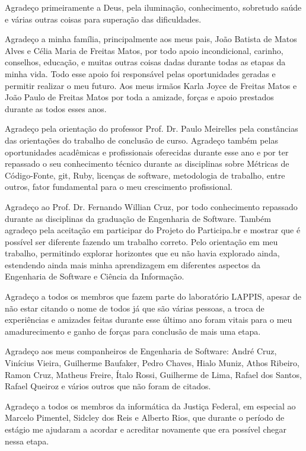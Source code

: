\begin{agradecimentos}

Agradeço primeiramente a Deus, pela iluminação, conhecimento, sobretudo saúde e várias outras coisas para superação das dificuldades.

%

Agradeço a minha família, principalmente aos meus pais, João Batista de Matos Alves e Célia Maria de Freitas Matos, por todo apoio incondicional, carinho, conselhos, educação, e muitas  outras coisas dadas durante todas as etapas da minha vida. Todo esse apoio foi responsável pelas oportunidades geradas e permitir realizar o meu futuro. Aos meus irmãos Karla Joyce de Freitas Matos e João Paulo de Freitas Matos por toda a amizade, forças e apoio prestados durante as todos esses anos.

%

Agradeço pela orientação do professor Prof. Dr. Paulo Meirelles pela constâncias das orientações do trabalho de conclusão de curso. Agradeço também pelas oportunidades acadêmicas e profissionais oferecidas durante esse ano e por ter repassado o seu conhecimento técnico durante as disciplinas sobre Métricas de Código-Fonte, git, Ruby, licenças de software, metodologia de trabalho, entre outros, fator fundamental para o meu crescimento profissional. 

%

Agradeço ao Prof. Dr. Fernando Willian Cruz, por todo conhecimento repassado durante as disciplinas da graduação de Engenharia de Software. Também agradeço pela aceitação em participar do Projeto do Participa.br e mostrar que é possível ser diferente fazendo um trabalho correto. Pelo orientação em meu trabalho, permitindo explorar horizontes que eu não havia explorado ainda, estendendo ainda mais minha aprendizagem em diferentes aspectos da Engenharia de Software e Ciência da Informação.

%

Agradeço a todos os membros que fazem parte do laboratório LAPPIS, apesar de não estar citando o nome de todos já que são várias pessoas, a troca de experiências e amizades feitas durante esse último ano foram vitais para o meu amadurecimento e ganho de forças para conclusão de mais uma etapa.

%

Agradeço aos meus companheiros de Engenharia de Software: André Cruz, Vinícius Vieira, Guilherme Baufaker, Pedro Chaves, Hialo Muniz, Athos Ribeiro, Ramon Cruz, Matheus Freire, Ítalo Rossi, Guilherme de Lima, Rafael dos Santos, Rafael Queiroz e vários outros que não foram de citados.

%

Agradeço a todos os membros da informática da Justiça Federal, em especial ao Marcelo Pimentel, Sidcley dos Reis e Alberto Rios, que durante o período de estágio me ajudaram a acordar e acreditar novamente que era possível chegar nessa etapa.

\end{agradecimentos}